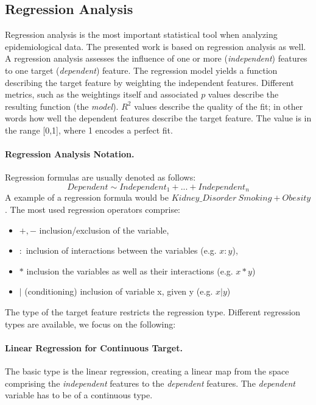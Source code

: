 \documentclass[journal]{style/vgtc} 			          %
\begin{document}
\subsection{Regression Analysis} \label{sec:RegressionAnalysis}
Regression analysis is the most important statistical tool when analyzing epidemiological data.
The presented work is based on regression analysis as well.
A regression analysis assesses the influence of one or more (\emph{independent}) features to one target (\emph{dependent}) feature.
The regression model yields a function describing the target feature by weighting the independent features.
Different metrics, such as the weightings itself and associated $p$ values describe the resulting function (the \emph{model}).
$R^2$ values describe the quality of the fit; in other words how well the dependent features describe the target feature.
The value is in the range [0,1], where 1 encodes a perfect fit.

\paragraph{Regression Analysis Notation.} Regression formulas are usually denoted as follows:
\begin{equation}
Dependent \sim Independent_1 + ... + Independent_n
\label{eq:RegressionNotation}
\end{equation}
A example of a regression formula would be $Kidney\_Disorder ~ Smoking + Obesity$.
The most used regression operators comprise:
\begin{itemize}
	\item $+,-$ inclusion/exclusion of the variable,
	\item $:$ inclusion of interactions between the variables (e.g. $x:y$),
	\item $*$ inclusion the variables as well as their interactions (e.g. $x*y$)
	\item $|$ (conditioning) inclusion of variable x, given y (e.g. $x|y$)
\end{itemize}
The type of the target feature restricts the regression type.
Different regression types are available, we focus on the following:
\paragraph{Linear Regression for Continuous Target.} The basic type is the linear regression, creating a linear map from the space comprising the \emph{independent} features to the \emph{dependent} features.
The \emph{dependent} variable has to be of a continuous type.
\end{document}
